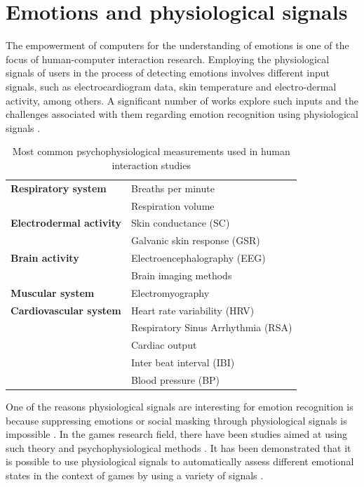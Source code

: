 \chapter{Emotions and physiological signals}
\label{ch:literature-physiological}

The empowerment of computers for the understanding of emotions is one of the focus of human-computer interaction research. Employing the physiological signals of users in the process of detecting emotions involves different input signals, such as electrocardiogram data, skin temperature and electro-dermal activity, among others. A significant number of works explore such inputs and the challenges associated with them regarding emotion recognition using physiological signals \parencite{jerritta2011physiological}.


\begin{table}[h]
\caption{Most common psychophysiological measurements used in human interaction studies \parencite{jerritta2011physiological}}
\label{table:physiological-signals}
\begin{tabular}{L{.4\linewidth}L{.5\linewidth}}%
\toprule%
\textbf{Respiratory system} & Breaths per minute\\
 & Respiration volume \\
\midrule
 \textbf{Electrodermal activity} & Skin conductance (SC) \\
 & Galvanic skin response (GSR) \\
\midrule
\textbf{Brain activity} & Electroencephalography (EEG) \\
& Brain imaging methods \\
\midrule
\textbf{Muscular system} & Electromyography \\
\midrule
\textbf{Cardiovascular system} & Heart rate variability (HRV) \\
& Respiratory Sinus Arrhythmia (RSA)  \\
& Cardiac output  \\
& Inter beat interval (IBI) \\
& Blood pressure (BP)  \\
\bottomrule%
\end{tabular}%
\end{table}

One of the reasons physiological signals are interesting for emotion recognition is because suppressing emotions or social masking through physiological signals is impossible \parencite{kim2004emotion}. In the games research field, there have been studies aimed at using such theory and psychophysiological methods \parencite{kivikangas2011review}. It has been demonstrated that it is possible to use physiological signals to automatically assess different emotional states in the context of games by using a variety of signals \parencite{bousefsaf2013remote,yun2009game,rani2006empirical,tijs2008dynamic}.

